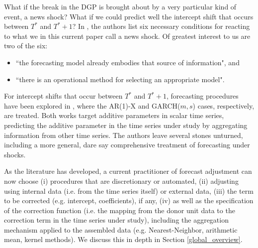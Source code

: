 \documentclass{uiucthesis2021}
\theoremstyle{definition}
\begin{document}
What if the break in the DGP is brought about by a very particular kind of event, a news shock?   What if we could predict well the intercept shift that occurs between $T^{*}$ and $T^{*}+1$?  In \cite{castle2016overview}, the authors list six necessary conditions for reacting to what we in this current paper call a news shock.  Of greatest interest to us are two of the six: 

\begin{itemize}
\item ``the forecasting model already embodies that source of information", and 
\item ``there is an operational method for selecting an appropriate model".
\end{itemize}   

For intercept shifts that occur between $T^{*}$ and $T^{*}+1$, forecasting procedures have been explored in \cite{lin2021minimizing,lundquist2024volatility}, where the AR(1)-X and GARCH($m,s$) cases, respectively, are treated.  Both works target additive parameters in scalar time series, predicting the additive parameter in the time series under study by aggregating information from other time series.  The authors leave several stones unturned, including a more general, dare say comprehensive treatment of forecasting under shocks.

As the literature has developed, a current practitioner of forecast adjustment can now choose (i) procedures that are discretionary or automated, (ii) adjusting using internal data (i.e. from the time series itself) or external data, (iii) the term to be corrected (e.g. intercept, coefficients), if any, (iv) as well as the specification of the correction function (i.e. the mapping from the donor unit data to the correction term in the time series under study), including the aggregation mechanism applied to the assembled data (e.g. Nearest-Neighbor, arithmetic mean, kernel methods).  We discuss this in depth in Section \ref{global_overview}.
\end{document}
